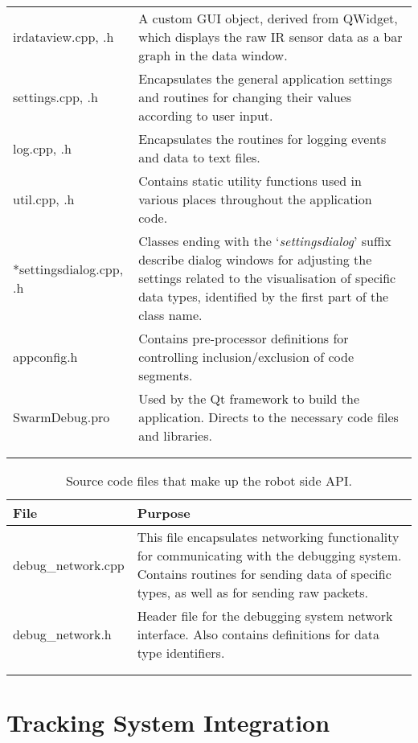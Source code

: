 \begin{longtable}{ l p{10cm} }
 irdataview.cpp, .h & A custom GUI object, derived from QWidget, which displays the raw IR sensor data as a bar graph in the data window.\\
 settings.cpp, .h & Encapsulates the general application settings and routines for changing their values according to user input.\\
 log.cpp, .h & Encapsulates the routines for logging events and data to text files.\\
 util.cpp, .h & Contains static utility functions used in various places throughout the application code.\\
 *settingsdialog.cpp, .h & Classes ending with the `\textit{settingsdialog}' suffix describe dialog windows for adjusting the settings related to the visualisation of specific data types, identified by the first part of the class name.\\
 appconfig.h & Contains pre-processor definitions for controlling inclusion/exclusion of code segments.\\
 SwarmDebug.pro & Used by the Qt framework to build the application. Directs to the necessary code files and libraries.\\
 \bottomrule\\
	
 \label{tab:CodeFiles}
\end{longtable}

\begin{longtable}{ l p{10cm} }
\caption[Robot-side Code Files]{Source code files that make up the robot side API.}\\
 File & Purpose\\
 \hline
 debug\_network.cpp & This file encapsulates networking functionality for communicating with the debugging system. Contains routines for sending data of specific types, as well as for sending raw packets.\\
 debug\_network.h & Header file for the debugging system network interface. Also contains definitions for data type identifiers.\\
 \bottomrule\\
	
 \label{tab:RobotCodeFiles}
\end{longtable}


\section{Tracking System Integration} \label{TrackingSystemIntegration}


